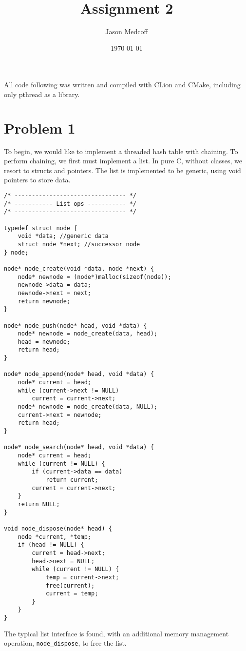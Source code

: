 \documentclass[11pt]{article}
\author{Jason Medcoff}
\date{\today}
\title{Assignment 2}
\begin{document}
\maketitle
All code following was written and compiled with CLion and CMake,
including only pthread as a library.

\section{Problem 1}
\label{sec-1}

To begin, we would like to implement a threaded hash table with
chaining. To perform chaining, we first must implement a list. In pure
C, without classes, we resort to structs and pointers. The list is
implemented to be generic, using void pointers to store data.

\begin{verbatim}
/* -------------------------------- */
/* ----------- List ops ----------- */
/* -------------------------------- */

typedef struct node {
    void *data; //generic data
    struct node *next; //successor node
} node;

node* node_create(void *data, node *next) {
    node* newnode = (node*)malloc(sizeof(node));
    newnode->data = data;
    newnode->next = next;
    return newnode;
}

node* node_push(node* head, void *data) {
    node* newnode = node_create(data, head);
    head = newnode;
    return head;
}

node* node_append(node* head, void *data) {
    node* current = head;
    while (current->next != NULL)
        current = current->next;
    node* newnode = node_create(data, NULL);
    current->next = newnode;
    return head;
}

node* node_search(node* head, void *data) {
    node* current = head;
    while (current != NULL) {
        if (current->data == data)
            return current;
        current = current->next;
    }
    return NULL;
}

void node_dispose(node* head) {
    node *current, *temp;
    if (head != NULL) {
        current = head->next;
        head->next = NULL;
        while (current != NULL) {
            temp = current->next;
            free(current);
            current = temp;
        }
    }
}
\end{verbatim}

The typical list interface is found, with an additional memory
management operation, \verb~node_dispose~, to free the list.
\end{document}
